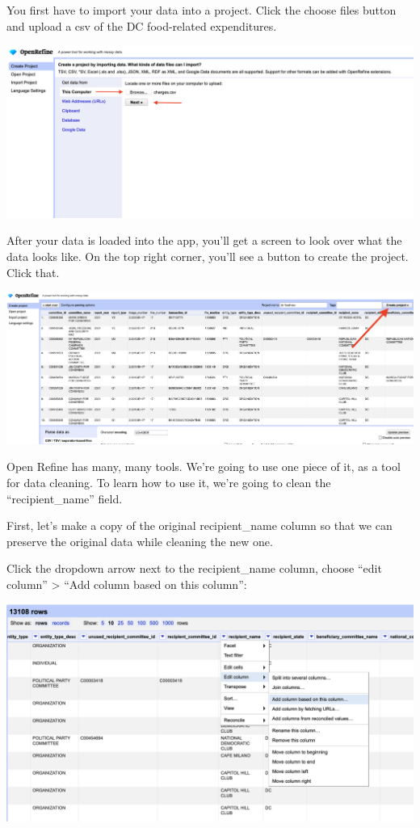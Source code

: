 \documentclass[
  letterpaper,
  DIV=11,
  numbers=noendperiod]{scrreprt}
\begin{document}
You first have to import your data into a project. Click the choose
files button and upload a csv of the DC food-related expenditures.

\includegraphics[width=8.51in,height=\textheight]{./images/open1.png}

After your data is loaded into the app, you'll get a screen to look over
what the data looks like. On the top right corner, you'll see a button
to create the project. Click that.

\includegraphics[width=11.9in,height=\textheight]{./images/open2.png}

Open Refine has many, many tools. We're going to use one piece of it, as
a tool for data cleaning. To learn how to use it, we're going to clean
the ``recipient\_name'' field.

First, let's make a copy of the original recipient\_name column so that
we can preserve the original data while cleaning the new one.

Click the dropdown arrow next to the recipient\_name column, choose
``edit column'' \textgreater{} ``Add column based on this column'':

\includegraphics[width=6.86in,height=\textheight]{./images/open2a.png}
\end{document}
